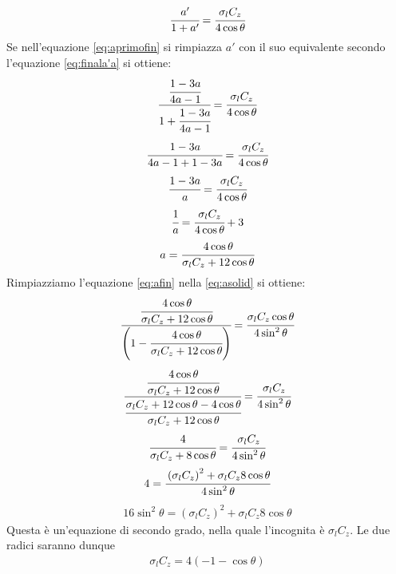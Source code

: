 \begin{equation}\label{eq:aprimofin}
\cfrac{a'}{1+a'} = \cfrac{\sigma_l C_z}{4 \cos \theta}
\end{equation}
Se nell'equazione \ref{eq:aprimofin} si rimpiazza $a'$ con il suo equivalente secondo l'equazione \ref{eq:finala'a} si ottiene:
\begin{align*}
\cfrac{\cfrac{1-3a}{4a-1}}{1+\cfrac{1-3a}{4a-1}} = \cfrac{\sigma_l C_z}{4 \cos \theta}
\end{align*}
\begin{align*}
\cfrac{1-3a}{4a-1+1-3a} = \cfrac{\sigma_l C_z}{4 \cos \theta}
\end{align*}
\begin{align*}
\cfrac{1-3a}{a} = \cfrac{\sigma_l C_z }{4 \cos \theta}
\end{align*}
\begin{align*}
\cfrac{1}{a} = \cfrac{\sigma_l C_z}{4 \cos \theta} + 3
\end{align*}
\begin{equation}\label{eq:afin}
a = \cfrac{4 \cos \theta}{\sigma_l C_z +12 \cos \theta}
\end{equation}
Rimpiazziamo l'equazione \ref{eq:afin} nella \ref{eq:asolid} si ottiene:
\begin{align*}
\cfrac{\cfrac{4 \cos \theta}{\sigma_l C_z + 12 \cos \theta}}{\left( 1- \cfrac{4 \cos \theta}{\sigma_l C_z + 12 \cos \theta} \right)} = \cfrac{\sigma_l C_z \cos \theta}{4 \sin^2 \theta}
\end{align*}
\begin{align*}
\cfrac{\cfrac{4 \cos \theta}{\sigma_l C_z + 12 \cos \theta}}{\cfrac{\sigma_l C_z + 12 \cos \theta - 4 \cos \theta}{\sigma_l C_z + 12 \cos \theta}} = \cfrac{\sigma_l C_z}{4 \sin^2 \theta}
\end{align*}
\begin{align*}
\cfrac{4}{\sigma_l C_z + 8 \cos \theta} = \cfrac{\sigma_l C_z}{4 \sin^2 \theta}
\end{align*}
\begin{align*}
4 = \cfrac{\left( \sigma_l C_z \right)^2 + \sigma_l C_z 8 \cos \theta}{4 \sin^2 \theta}
\end{align*}
\begin{align*}
16 \sin^2 \theta = \left( \sigma_l C_z \right)^2 + \sigma_l C_z 8 \cos \theta
\end{align*}
Questa è un'equazione di secondo grado, nella quale l'incognita è $\sigma_l C_z$. Le due radici saranno dunque
\begin{align*}
\sigma_l C_z = 4 \left(-1 -\cos \theta \right)
\end{align*}
